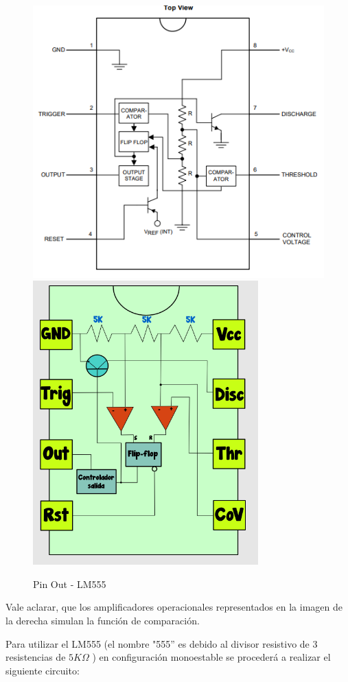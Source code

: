 \begin{figure}[H]
\centering
\includegraphics[scale=0.5]{pinOutLM55(a).PNG}
\qquad
\includegraphics[scale=0.5]{pinOutLM55(b).PNG}
\caption{Pin Out - LM555}
\end{figure}

Vale aclarar, que los amplificadores operacionales representados en
la imagen de la derecha simulan la función de comparación.

Para utilizar el LM555 (el nombre "555'' es debido al divisor resistivo
de 3 resistencias de $5K\Omega$ ) en configuración monoestable se
procederá a realizar el siguiente circuito:

